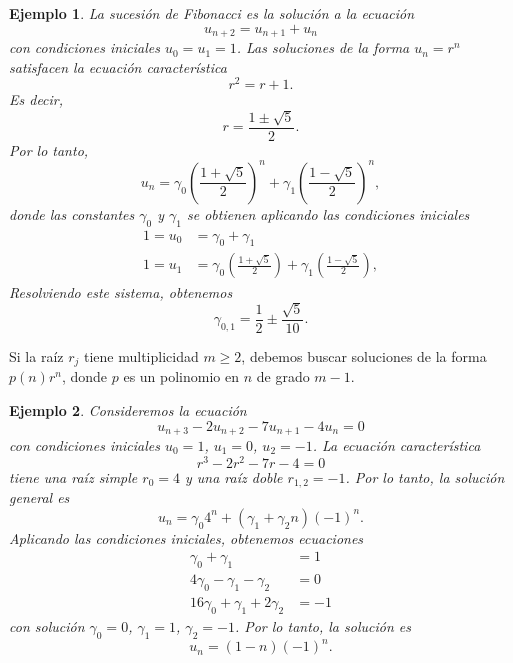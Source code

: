 \documentclass[11pt,letterpaper]{article}
\newtheorem{example}{Ejemplo}
\begin{document}
\begin{example}
  La sucesión de Fibonacci es la solución a la ecuación
  \begin{equation}
    u_{n+2} = u_{n+1} + u_n
  \end{equation}
  con condiciones iniciales $u_0=u_1=1$.
  Las soluciones de la forma $u_n=r^n$ satisfacen la ecuación
  característica
  \begin{equation}
    r^2 = r + 1
  .\end{equation}
  Es decir,
  \begin{equation}
    r = \frac{1\pm\sqrt 5}{2}
  .\end{equation}
  Por lo tanto,
  \begin{equation}
    u_n = \gamma_0
    \left( \frac{1+\sqrt 5}{2} \right)^n
    +
    \gamma_1
    \left( \frac{1-\sqrt 5}{2} \right)^n
  ,\end{equation}
  donde las constantes $\gamma_0$ y $\gamma_1$ se obtienen aplicando
  las condiciones iniciales
  \begin{align}
    1 = u_0 &= \gamma_0
    +
    \gamma_1
    \\
    1 = u_1 &= \gamma_0
    \left( \frac{1+\sqrt 5}{2} \right)
    +
    \gamma_1
    \left( \frac{1-\sqrt 5}{2} \right)
  ,\end{align}
  Resolviendo este sistema, obtenemos
  \begin{equation}
    \gamma_{0,1} = \frac{1}{2} \pm \frac{\sqrt 5}{10}
  .\end{equation}
\end{example}

Si la raíz $r_j$ tiene multiplicidad $m\geq 2$, debemos buscar
soluciones de la forma $p(n)r^n$, donde $p$ es un polinomio en $n$ de
grado $m-1$.

\begin{example}
  Consideremos la ecuación
  \begin{equation}
    u_{n+3} -2u_{n+2} - 7 u_{n+1} - 4u_n = 0
  \end{equation}
  con condiciones iniciales $u_0=1$, $u_1=0$, $u_{2}=-1$.
  La ecuación característica
  \begin{equation}
    r^{3}-2r^{2}-7r-4 = 0
  \end{equation}
  tiene una raíz simple $r_0=4$ y una raíz doble $r_{1,2}=-1$.
  Por lo tanto, la solución general es
  \begin{equation}
    u_n = \gamma_{0}4^n + (\gamma_1+\gamma_2n)(-1)^n
  .\end{equation}
  Aplicando las condiciones iniciales, obtenemos ecuaciones
  \begin{align}
    \gamma_0+\gamma_1 &= 1 \\
    4\gamma_0-\gamma_1-\gamma_2 &= 0 \\
    16\gamma_0+\gamma_1+2\gamma_2&= -1
  \end{align}
  con solución $\gamma_0=0$, $\gamma_1=1$, $\gamma_2=-1$.
  Por lo tanto, la solución es
  \begin{equation}
    u_n = (1-n)(-1)^{n}
  .\end{equation}
\end{example}
\end{document}
